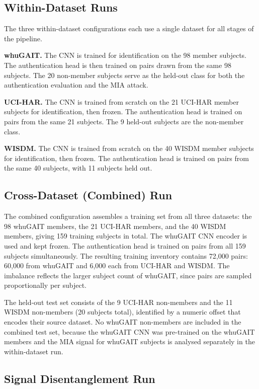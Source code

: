 \subsection{Within-Dataset Runs}
\label{ssec:sys_within}

The three within-dataset configurations each use a single dataset for all stages of the pipeline.

\textbf{whuGAIT.} The CNN is trained for identification on the 98 member subjects. The authentication head is then trained on pairs drawn from the same 98 subjects. The 20 non-member subjects serve as the held-out class for both the authentication evaluation and the MIA attack.

\textbf{UCI-HAR.} The CNN is trained from scratch on the 21 UCI-HAR member subjects for identification, then frozen. The authentication head is trained on pairs from the same 21 subjects. The 9 held-out subjects are the non-member class.

\textbf{WISDM.} The CNN is trained from scratch on the 40 WISDM member subjects for identification, then frozen. The authentication head is trained on pairs from the same 40 subjects, with 11 subjects held out.

\subsection{Cross-Dataset (Combined) Run}
\label{ssec:sys_combined}

The combined configuration assembles a training set from all three datasets: the 98 whuGAIT members, the 21 UCI-HAR members, and the 40 WISDM members, giving 159 training subjects in total. The whuGAIT CNN encoder is used and kept frozen. The authentication head is trained on pairs from all 159 subjects simultaneously. The resulting training inventory contains 72,000 pairs: 60,000 from whuGAIT and 6,000 each from UCI-HAR and WISDM. The imbalance reflects the larger subject count of whuGAIT, since pairs are sampled proportionally per subject.

The held-out test set consists of the 9 UCI-HAR non-members and the 11 WISDM non-members (20 subjects total), identified by a numeric offset that encodes their source dataset. No whuGAIT non-members are included in the combined test set, because the whuGAIT CNN was pre-trained on the whuGAIT members and the MIA signal for whuGAIT subjects is analysed separately in the within-dataset run.

\subsection{Signal Disentanglement Run}
\label{ssec:sys_signal}

